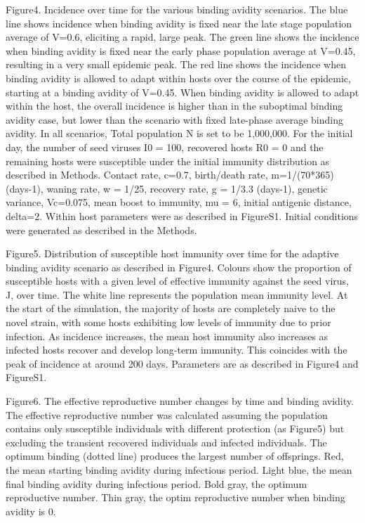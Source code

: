 \documentclass[12pt,a4paper]{article}
\begin{document}
Figure4. Incidence over time for the various binding avidity scenarios. The blue line shows incidence when binding avidity is fixed near the late stage population average of V=0.6, eliciting a rapid, large peak. The green line shows the incidence when binding avidity is fixed near the early phase population average at V=0.45, resulting in a very small epidemic peak. The red line shows the incidence when binding avidity is allowed to adapt within hosts over the course of the epidemic, starting at a binding avidity of V=0.45. When binding avidity is allowed to adapt within the host, the overall incidence is higher than in the suboptimal binding avidity case, but lower than the scenario with fixed late-phase average binding avidity. In all scenarios, Total population N is set to be 1,000,000. For the initial day, the number of seed viruses I0 = 100, recovered hosts R0 = 0 and the remaining hosts were susceptible under the initial immunity distribution as described in Methods. Contact rate, c=0.7, birth/death rate, m=1/(70*365)(days-1), waning rate, w = 1/25, recovery rate, g = 1/3.3 (days-1), genetic variance, Vc=0.075, mean boost to immunity, mu = 6, initial antigenic distance, delta=2. Within host parameters were as described in FigureS1. Initial conditions were generated as described in the Methods.

Figure5. Distribution of susceptible host immunity over time for the adaptive binding avidity scenario as described in Figure4. Colours show the proportion of susceptible hosts with a given level of effective immunity against the seed virus, J, over time. The white line represents the population mean immunity level. At the start of the simulation, the majority of hosts are completely naive to the novel strain, with some hosts exhibiting low levels of immunity due to prior infection. As incidence increases, the mean host immunity also increases as infected hosts recover and develop long-term immunity. This coincides with the peak of incidence at around 200 days. Parameters are as described in Figure4 and FigureS1.

Figure6. The effective reproductive number changes by time and binding avidity. The effective reproductive number was calculated assuming the population contains only susceptible individuals with different protection (as Figure5) but excluding the transient recovered individuals and infected individuals. The optimum binding (dotted line) produces the largest number of offsprings. Red, the mean starting binding avidity during infectious period. Light blue, the mean final binding avidity during infectious period. Bold gray, the optimum reproductive number. Thin gray, the optim reproductive number when binding avidity is 0.
\end{document}
